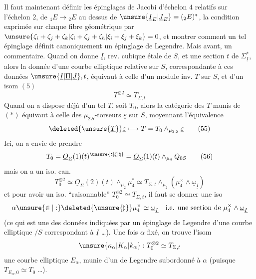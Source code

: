 Il faut maintenant définir les épinglages de Jacobi d'échelon $4$ relatifs sur l'échelon $2$,   de $ {}_4E\longrightarrow {}_2E$ au dessus de $\unsure{\underline I_E|\underline J_E}=({}_2E)^*$,  la condition exprimée  sur chaque fibre géométrique par $\unsure{\zeta_i+\zeta_j+\zeta_k|\zeta_i+\zeta_j+\zeta_h|\xi_i+\xi_j+\xi_k}=0$, et montrer comment un tel épinglage définit canoniquement un épinglage de Legendre.
Mais avant, un commentaire. Quand on donne $\underline I$, rev. cubique étale de $S$, et une section $t$ de $\Sigma_{\underline I}^*$, alors la donnée d'une courbe elliptique relative sur $S$, correspondante à ces données $\unsure{\underline I|\underline\Pi|\underline J},t$, équivaut à celle d'un module inv. $T$ sur $S$, et d'un isom $(5)$
\[
T^{\otimes2}\simeq T_{\Sigma,t} \tag*{(*)}
\]
Quand on a dispose déjà d'un tel $T$, soit $T_0$, alors la catégorie des $T$  munis de $(*)$ équivaut à celle des $\mu_{2\,S}$-torseurs $\underline\varepsilon$ sur $S$, moyennant l'équivalence
\[
\deleted{\unsure{\underline T}}\underline\varepsilon\longmapsto T=T_0\mathbin{\wedge}_{\mu_{2\,S}}\underline\varepsilon \tag*{(55)}
\]
Ici, on a envie de prendre
\[
T_0=\underline O_\Sigma(1)(t)^{\unsure{\sharp|\xi|\natural}}=\underline O_\Sigma(1)(t)\mathbin{\wedge}_{\mu_4}Q_{0S} \tag*{(56)}
\]
mais on a un iso. can.
\[
T_0^{\otimes2}\simeq\underline O_\Sigma(2)(t)\mathbin{\wedge}_{\mu_2}\mu_4^*
\simeq T_{\Sigma,t}\mathbin{\wedge}_{\mu_2}(\mu_4^\times\mathbin{\wedge}\underline\omega_{\underline I})
\]
et pour avoir un iso. ``raisonnable'' $T_0^{\otimes2}\simeq T_{\Sigma,t}$, il faut se donner une  iso
\[
\alpha\unsure{\in|:}\deleted{\unsure{\sharp}}\mu_4^\times\simeq\underline\omega_{\underline I}
\quad\text{i.e. une section de }\mu_4^\times\mathbin{\wedge}\underline\omega_{\underline I}
\]
(ce qui est une des données indiquées par un épinglage de Legendre d'une courbe elliptique $/S$ correspondant à $\underline I$ \ldots). Une fois $\alpha$ fixé, on
trouve l'isom
\[
\unsure{\kappa_\alpha|K_\alpha|k_\alpha}:T_0^{\otimes2}\simeq T_{\Sigma,t}
\]
 une courbe elliptique $E_\alpha$,  munie d'un   de Legendre subordonné à $\alpha$ (puisque $T_{E_\alpha,0}\simeq T_0$ \ldots).
